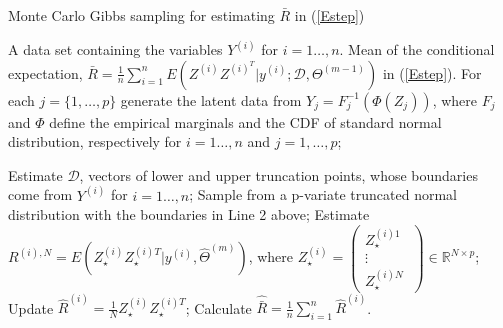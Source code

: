 \begin{algorithm}[!b]%
	\renewcommand{\algorithmicrequire}{\textbf{Input:} }
	\renewcommand{\algorithmicensure}{\textbf{Output:} }
	\caption{Monte Carlo Gibbs sampling for estimating $\bar{R}$ in (\ref{Estep}) }
	\label{algorithm:gibbs}
	\begin{algorithmic}[1]
		\REQUIRE A data set containing the variables $Y^{(i)}$ for $i = 1 \ldots, n$.
		\ENSURE  Mean of the conditional expectation, $\bar{R} = \frac{1}{n} \sum\limits_{i=1}^{n} E( Z^{(i)} Z^{(i)^T} | y^{(i)};  \mathcal{D}, \Theta^{(m-1)})$ in  (\ref{Estep}).
		\vspace{0.1cm}
		\STATE For each $j = \{1, \ldots,p\} $ generate the latent data from $Y_j= F^{-1}_j(\Phi(Z_j))$, where $F_j$ and $\Phi$ define the empirical marginals and the CDF of standard normal distribution, respectively for $i = 1 \ldots, n$ and $j = 1, \ldots, p$;
		
		\STATE Estimate $\mathcal{D}$, vectors of lower and upper truncation points, whose boundaries come from  $Y^{(i)}$ for $i = 1 \ldots, n$; %
		\STATE Sample from a p-variate truncated normal distribution with the boundaries in Line 2 above; %
		\STATE Estimate $R^{(i), N} = E(Z_\star^{(i)} Z_\star^{(i)T} | y^{(i)}, \widehat{\Theta}^{(m)})$, where $
		Z_\star^{(i)}=
		\left( {\begin{array}{c}
				Z_\star^{(i)1}\\   \vdots    \\ Z_\star^{(i)N} \      \end{array} } \right) \in \mathbb{R}^{N \times p}$;
		\ENDFOR
		\STATE Update $\widehat{R}^{(i)} =  \frac{1}{N} Z_\star^{(i)} Z_\star^{(i)T} $;
		\ENDFOR
		\STATE Calculate  $\widehat{\bar{R}} = \frac{1}{n} \sum\limits_{i=1}^{n} \widehat{R}^{(i)}$.
	\end{algorithmic}
\end{algorithm}

